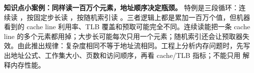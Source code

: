 \begin{casebox}
\textbf{知识点小案例：同样读一百万个元素，地址顺序决定瓶颈。}
特例是三段循环：连续读 ，按固定步长读 ，按随机索引读 。三者逻辑上都是累加一百万个值，但机器看到的 cache line 利用率、TLB 覆盖和预取可能完全不同。连续读能把一条 cache line 的多个元素都用掉；大步长可能每次只用一个元素；随机索引还会让预取器失效。由此推出规律：复杂度相同不等于地址流相同。工程上分析内存问题时，先写出地址公式、工作集大小、页数和访问顺序，再看 cache/TLB 指标；不能只用  解释内存性能。
\end{casebox}
